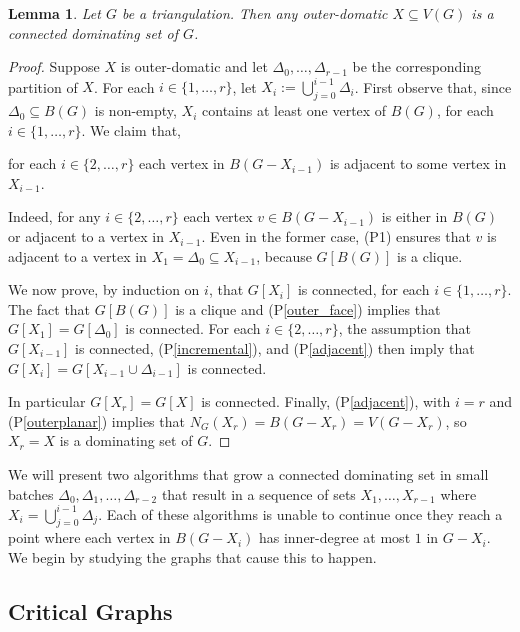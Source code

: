 \documentclass{article}
\newcommand{\pref}[1]{(P\ref{#1})}
\newtheorem{lem}{Lemma}
\theoremstyle{definition}
\begin{document}
\begin{lem}\label{outer_domatic}
    Let $G$ be a triangulation.  Then any outer-domatic $X\subseteq V(G)$ is a connected dominating set of $G$.
\end{lem}

\begin{proof}
  Suppose $X$ is outer-domatic and let $\Delta_0,\ldots,\Delta_{r-1}$ be the corresponding partition of $X$.  For each $i\in\{1,\ldots,r\}$, let $X_i:=\bigcup_{j=0}^{i-1} \Delta_i$.  First observe that, since $\Delta_0\subseteq B(G)$ is non-empty, $X_i$ contains at least one vertex of $B(G)$, for each $i\in\{1,\ldots,r\}$. We claim that,
  \begin{compactenum}[(P1)]\setcounter{enumi}{3}
    \item for each $i\in\{2,\ldots,r\}$ each vertex in $B(G-X_{i-1})$ is adjacent to some vertex in $X_{i-1}$. \label{adjacent}
  \end{compactenum}
  Indeed, for any $i\in\{2,\ldots,r\}$ each vertex $v\in B(G-X_{i-1})$ is either in $B(G)$ or adjacent to a vertex in $X_{i-1}$. Even in the former case, (P1) ensures that $v$ is adjacent to a vertex in $X_1=\Delta_0\subseteq X_{i-1}$, because $G[B(G)]$ is a clique.

  We now prove, by induction on $i$, that $G[X_i]$ is connected, for each $i\in\{1,\ldots,r\}$.
  The fact that $G[B(G)]$ is a clique and \pref{outer_face} implies that $G[X_1]=G[\Delta_0]$ is connected. For each $i\in\{2,\ldots,r\}$, the assumption that $G[X_{i-1}]$ is connected, \pref{incremental}, and \pref{adjacent} then imply that $G[X_i]=G[X_{i-1}\cup\Delta_{i-1}]$ is connected.

  In particular $G[X_r]=G[X]$ is connected.  Finally, \pref{adjacent}, with $i=r$ and \pref{outerplanar} implies that $N_G(X_r)=B(G-X_r)=V(G-X_r)$, so $X_r=X$ is a dominating set of $G$.
\end{proof}

We will present two algorithms that grow a connected dominating set in small batches $\Delta_0,\Delta_1,\ldots,\Delta_{r-2}$ that result in a sequence of sets $X_1,\ldots,X_{r-1}$ where $X_{i}=\bigcup_{j=0}^{i-1}\Delta_j$.  Each of these algorithms is unable to continue once they reach a point where each vertex in $B(G-X_i)$ has inner-degree at most $1$ in $G-X_i$.  We begin by studying the graphs that cause this to happen.

\subsection{Critical Graphs}
\end{document}
